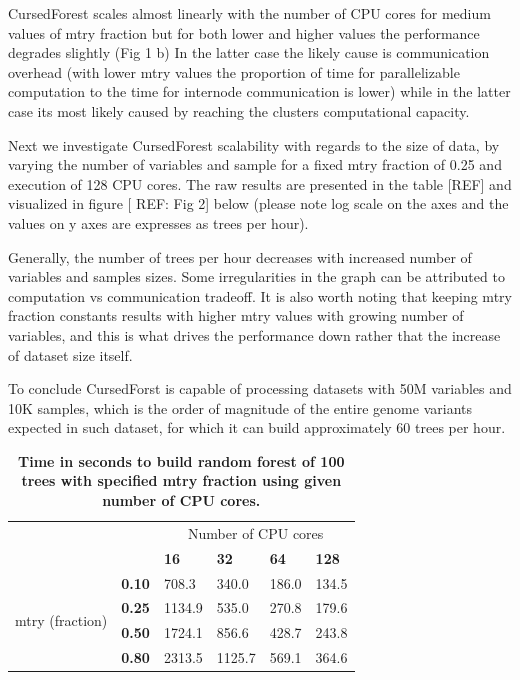 \documentclass[10pt,a4paper]{article}  %
\begin{document}
CursedForest scales almost linearly with the number of CPU cores for medium values of mtry fraction but for both lower and higher values the performance degrades slightly (Fig 1 b)  In the latter case the likely cause is communication overhead (with lower mtry values the proportion of time for parallelizable computation to the time for internode communication is lower) while in the latter case its most likely caused by reaching the clusters computational capacity.

Next we investigate CursedForest scalability with regards to the size of data, by varying the number of variables and sample for a fixed mtry fraction of 0.25 and execution of 128 CPU cores. The raw results are presented in the table [REF] and visualized in figure [ REF: Fig 2] below (please note log scale on the axes and the values on y axes are expresses as trees per hour).

Generally, the number of trees per hour decreases with increased number of variables and samples sizes. Some irregularities in the graph can be attributed to computation vs communication tradeoff. It is also worth noting that keeping mtry fraction constants results with higher mtry values with growing number of variables, and this is what drives the performance down rather that the increase of dataset size itself.


To conclude CursedForst is capable of processing datasets with 50M variables and 10K samples, which is the order of magnitude of the entire genome variants expected in such dataset, for which it can build approximately 60 trees per hour.



\begin{table}[!ht]
\centering
\caption{
{\bf Time in seconds to build random forest of 100
  trees with specified mtry fraction using given number of CPU cores.}}
\begin{tabular}{|l|l||l|l|l|l|}
\hline
\multicolumn{2}{|l|}{\multirow{2}{*}{}}                   & \multicolumn{4}{c|}{Number of CPU cores}  \\
\cline{3-6}
\multicolumn{2}{|l|}{}                                      & \bf{16}   & \bf{32}  & \bf{64}    & \bf{128} \\
\hline
\multirow{4}{*}{mtry (fraction)}                            & \bf{0.10} & 708.3  & 340.0  & 186.0 & 134.5 \\
                                                            & \bf{0.25} & 1134.9 & 535.0  & 270.8 & 179.6 \\
                                                            & \bf{0.50} & 1724.1 & 856.6  & 428.7 & 243.8 \\
                                                            & \bf{0.80} & 2313.5 & 1125.7 & 569.1 & 364.6 \\
\hline
\end{tabular}
\begin{flushleft} 
\end{flushleft}
\label{table10}
\end{table}
\end{document}
